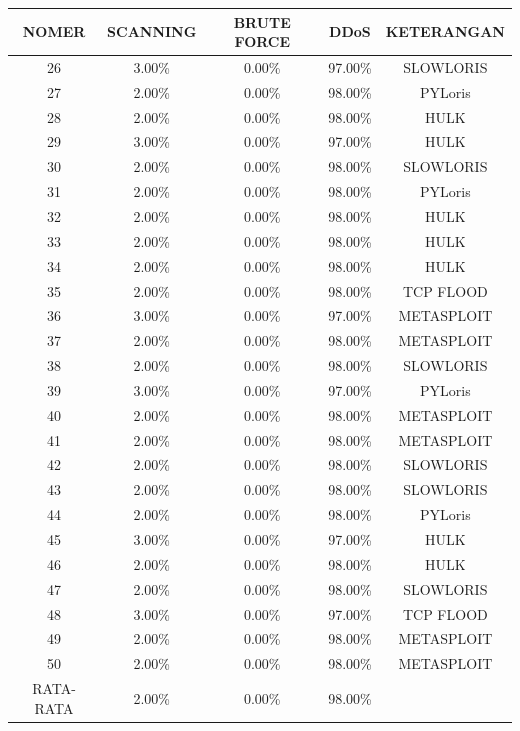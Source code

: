 \begin{table}[H]
	\centering

	\begin{tabular}{|c|c|c|c|c|}
		\hline
		NOMER        & SCANNING & BRUTE FORCE & DDoS    & KETERANGAN \\ \hline
		26        & 3.00\%   & 0.00\%      & 97.00\% & SLOWLORIS  \\ \hline
		27        & 2.00\%   & 0.00\%      & 98.00\% & PYLoris    \\ \hline
		28        & 2.00\%   & 0.00\%      & 98.00\% & HULK       \\ \hline
		29        & 3.00\%   & 0.00\%      & 97.00\% & HULK       \\ \hline
		30        & 2.00\%   & 0.00\%      & 98.00\% & SLOWLORIS  \\ \hline
		31        & 2.00\%   & 0.00\%      & 98.00\% & PYLoris    \\ \hline
		32        & 2.00\%   & 0.00\%      & 98.00\% & HULK       \\ \hline
		33        & 2.00\%   & 0.00\%      & 98.00\% & HULK       \\ \hline
		34        & 2.00\%   & 0.00\%      & 98.00\% & HULK       \\ \hline
		35        & 2.00\%   & 0.00\%      & 98.00\% & TCP FLOOD  \\ \hline
		36        & 3.00\%   & 0.00\%      & 97.00\% & METASPLOIT \\ \hline
		37        & 2.00\%   & 0.00\%      & 98.00\% & METASPLOIT \\ \hline
		38        & 2.00\%   & 0.00\%      & 98.00\% & SLOWLORIS  \\ \hline
		39        & 3.00\%   & 0.00\%      & 97.00\% & PYLoris    \\ \hline
		40        & 2.00\%   & 0.00\%      & 98.00\% & METASPLOIT \\ \hline
		41        & 2.00\%   & 0.00\%      & 98.00\% & METASPLOIT \\ \hline
		42        & 2.00\%   & 0.00\%      & 98.00\% & SLOWLORIS  \\ \hline
		43        & 2.00\%   & 0.00\%      & 98.00\% & SLOWLORIS  \\ \hline
		44        & 2.00\%   & 0.00\%      & 98.00\% & PYLoris    \\ \hline
		45        & 3.00\%   & 0.00\%      & 97.00\% & HULK       \\ \hline
		46        & 2.00\%   & 0.00\%      & 98.00\% & HULK       \\ \hline
		47        & 2.00\%   & 0.00\%      & 98.00\% & SLOWLORIS  \\ \hline
		48        & 3.00\%   & 0.00\%      & 97.00\% & TCP FLOOD  \\ \hline
		49        & 2.00\%   & 0.00\%      & 98.00\% & METASPLOIT \\ \hline
		50        & 2.00\%   & 0.00\%      & 98.00\% & METASPLOIT \\ \hline
		RATA-RATA & 2.00\%   & 0.00\%      & 98.00\% &            \\ \hline
	\end{tabular}
\end{table}
	
